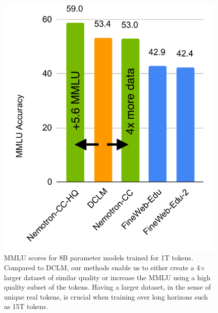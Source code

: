 \documentclass[11pt]{article}
\newcommand{\DCLM}{\textsc{DCLM}\xspace}
\begin{document}
\begin{figure}[th!]
\centering
\includegraphics[width=0.8\linewidth]{figures/figure1.pdf}
\caption{MMLU scores for 8B parameter models trained for 1T tokens. Compared to \DCLM, our methods enable us to either create a 4$\times$ larger dataset of similar quality or increase the MMLU using a high quality subset of the tokens. Having a larger dataset, in the sense of unique real tokens, is crucial when training over long horizons such as 15T tokens.}
\label{fig:main}
\end{figure}
\end{document}
